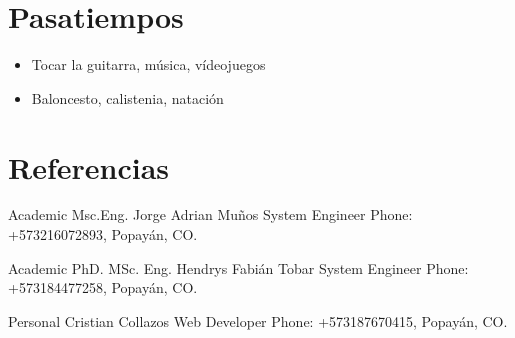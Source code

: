 \documentclass[american]{cv-class}
\begin{document}
\newpage
\section{Pasatiempos}
    \begin{itemize}
        \item
        {Tocar la guitarra, música, vídeojuegos}
        \item
        {Baloncesto, calistenia, natación}
        \\
    \end{itemize}



    	
    	

\section{Referencias}
\begin{entrylist}
	
	\entry
	{Academic}
	{Msc.Eng. Jorge Adrian Muños}
	{System Engineer} 
	{Phone: +573216072893, Popayán, CO.}

	\entry
	{Academic}
	{PhD. MSc. Eng. Hendrys Fabián Tobar}
	{System Engineer} 
	{Phone: +573184477258, Popayán, CO.}
	
	\entry
    {Personal}
	{Cristian Collazos}
	{Web Developer} 
	{Phone: +573187670415, Popayán, CO.}

%	
%

\end{entrylist}
\end{document}
